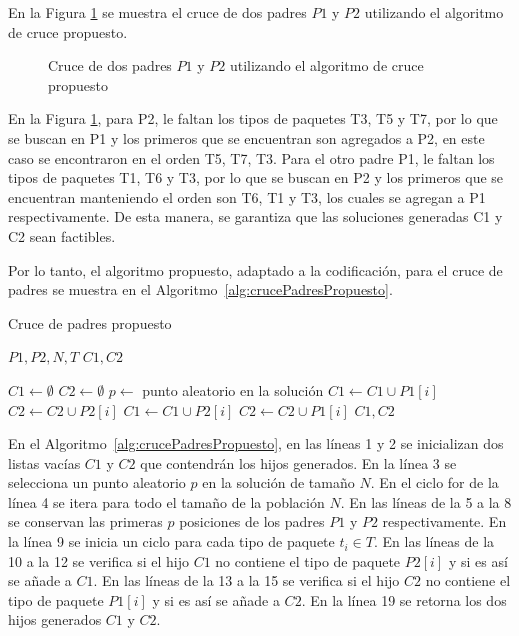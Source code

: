 En la Figura \ref{fig:cruce_propuesto} se muestra el cruce de dos padres $P1$ y $P2$ utilizando el algoritmo de cruce propuesto.

\begin{figure}[H]
    \centering
    
    \caption{Cruce de dos padres $P1$ y $P2$ utilizando el algoritmo de cruce propuesto}
    \label{fig:cruce_propuesto}
\end{figure}

En la Figura \ref{fig:cruce_propuesto}, para P2, le faltan los tipos de paquetes T3, T5 y T7, por lo que se buscan en P1 y los primeros que se encuentran son agregados a P2, en este caso se encontraron en el orden T5, T7, T3. Para el otro padre P1, le faltan los tipos de paquetes T1, T6 y T3, por lo que se buscan en P2 y los primeros que se encuentran manteniendo el orden son T6, T1 y T3, los cuales se agregan a P1 respectivamente. De esta manera, se garantiza que las soluciones generadas C1 y C2 sean factibles.

Por lo tanto, el algoritmo propuesto, adaptado a la codificación, para el cruce de padres se muestra en el Algoritmo~\ref{alg:crucePadresPropuesto}.

\begin{algorithm}[H]
    \caption{Cruce de padres propuesto}\label{alg:crucePadresPropuesto}
    \begin{algorithmic}[1]
        \Require $P1, P2, N, T$
        \Ensure $C1, C2$

        \State $C1 \leftarrow \emptyset$
        \State $C2 \leftarrow \emptyset$
        \State $p \leftarrow$ punto aleatorio en la solución
        \State $C1 \leftarrow C1 \cup P1[i]$
        \State $C2 \leftarrow C2 \cup P2[i]$
        \Else
        \State $C1 \leftarrow C1 \cup P2[i]$
        \EndIf
        \State $C2 \leftarrow C2 \cup P1[i]$
        \EndIf
        \EndFor
        \EndIf
        \EndFor
        \State \Return $C1, C2$
    \end{algorithmic}
\end{algorithm}

En el Algoritmo~\ref{alg:crucePadresPropuesto}, en las líneas 1 y 2 se inicializan dos listas vacías $C1$ y $C2$ que contendrán los hijos generados. En la línea 3 se selecciona un punto aleatorio $p$ en la solución de tamaño $N$. En el ciclo for de la línea 4 se itera para todo el tamaño de la población $N$. En las líneas de la 5 a la 8 se conservan las primeras $p$ posiciones de los padres $P1$ y $P2$ respectivamente. En la línea 9 se inicia un ciclo para cada tipo de paquete $t_i \in T$. En las líneas de la 10 a la 12 se verifica si el hijo $C1$ no contiene el tipo de paquete $P2[i]$ y si es así se añade a $C1$. En las líneas de la 13 a la 15 se verifica si el hijo $C2$ no contiene el tipo de paquete $P1[i]$ y si es así se añade a $C2$. En la línea 19 se retorna los dos hijos generados $C1$ y $C2$.

